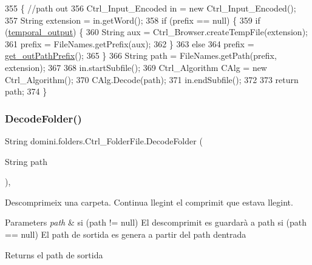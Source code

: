 \begin{DoxyCode}
355                                              \{ \textcolor{comment}{//path out}
356         Ctrl\_Input\_Encoded in = \textcolor{keyword}{new} Ctrl\_Input\_Encoded();
357         String extension = in.getWord();
358         \textcolor{keywordflow}{if} (prefix == null) \{
359             \textcolor{keywordflow}{if} (\hyperlink{classdomini_1_1folders_1_1Ctrl__FolderFile_a0db81590abe27b21a9b8c37633c86fa6}{temporal\_output}) \{
360                 String aux = Ctrl\_Browser.createTempFile(extension);
361                 prefix = FileNames.getPrefix(aux);
362             \}
363             \textcolor{keywordflow}{else}
364                 prefix = \hyperlink{classdomini_1_1folders_1_1Ctrl__FolderFile_a11c6b1b4a25d12b8091c7c96b3da1ea7}{get\_outPathPrefix}();
365         \}
366         String path = FileNames.getPath(prefix, extension);
367 
368         in.startSubfile();
369         Ctrl\_Algorithm CAlg = \textcolor{keyword}{new} Ctrl\_Algorithm();
370         CAlg.Decode(path);
371         in.endSubfile();
372 
373         \textcolor{keywordflow}{return} path;
374     \}
\end{DoxyCode}
\mbox{\label{classdomini_1_1folders_1_1Ctrl__FolderFile_ae8f46feaced983c27c6537794f823dd8}} 
\subsubsection{\texorpdfstring{Decode\+Folder()}{DecodeFolder()}}
{\footnotesize\ttfamily String domini.\+folders.\+Ctrl\+\_\+\+Folder\+File.\+Decode\+Folder (\begin{DoxyParamCaption}\item[{String}]{path }\end{DoxyParamCaption})\hspace{0.3cm}{\ttfamily [inline]}, {\ttfamily [private]}}



Descomprimeix una carpeta. Continua llegint el comprimit que estava llegint. 


\begin{DoxyParams}{Parameters}
{\em path} & si (path != null) El descomprimit es guardarà a path si (path == null) El path de sortida es genera a partir del path d\textquotesingle{}entrada \\
\hline
\end{DoxyParams}
\begin{DoxyReturn}{Returns}
el path de sortida 
\end{DoxyReturn}

